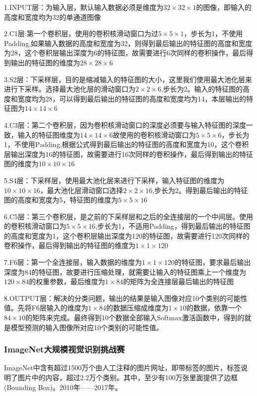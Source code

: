 \documentclass[openbib]{article}
\begin{document}
1.INPUT层：为输入层，默认输入数据必须是维度为$32\times32\times1$的图像，即输入的高度和宽度均为32的单通道图像

2.C1层:第一个卷积层，使用的卷积核滑动窗口为过$5\times5\times1$，步长为1，不使用Padding,如果输入数据的高度和宽度为32，则得到最后输出的特征图的高度和宽度为28，这个卷积层输出深度为6的特征图，故需要进行6次同样的卷积操作，最后得到输出的特征图的维度为$28\times28\times6$

3.S2层：下采样层，目的是缩减输入的特征图的大小，这里我们使用最大池化层来进行下采样。选择最大池化层的滑动窗口为$2\times2\times6$,步长为2。输入的特征图的高度和宽度均为28，可以得到最后输出的特征图的高度和宽度均为14，本层输出的特征图为$14\times14\times6$

4.C3层：第二个卷积层，因为卷积核滑动窗口的深度必须要与输入特征图的深度一致，输入的特征图维度为$14\times14\times6$故使用的卷积核滑动窗口为$5\times5\times6$，步长为1，不使用Padding,根据公式得到最后输出的特征图的高度和宽度为10，这个卷积层输出深度为16的特征图，故需要进行16次同样的卷积操作，最后得到输出的特征图的维度为$10\times10\times16$

5.S4层：下采样层，使用最大池化层来进行下采样，输入特征图的维度为$10\times10\times16$，最大池化层滑动窗口选择$2\times2\times16$,步长为2。得到最后输出的特征图的高度和宽度为5，特征图的维度为$5\times5\times16$

6.C5层：第三个卷积层，是之前的下采样层和之后的全连接层的一个中间层。使用的卷积核滑动窗口为$5\times5\times16$,步长为1，不适用Padding，得到最后输出的特征图的高度和宽度为1，这个卷积层输出深度为120的特征图，故需要进行120次同样的卷积操作，最后得到输出的特征图的维度为$1\times1\times120$

7.F6层：第一个全连接层，输入数据的维度为$1\times1\times120$的特征图，要求最后输出深度为84的特征图，故要进行压缩处理，就需要让输入的特征图乘上一个维度为$120\times84$的权重参数，最后维度为$1\times84$的矩阵为全连接层最后输出的特征图

8.OUTPUT层：解决的分类问题，输出的结果是输入图像对应10个类别的可能性值。先将F6层输入的维度为$1\times84$的数据压缩成维度为$1\times10$的数据，依靠一个$84\times10$的矩阵来完成。最终得到10个数据全部输入Softmax激活函数中，得到的就是模型预测的输入图像所对应10个类别的可能性值。

\subsubsection{ImageNet大规模视觉识别挑战赛}
ImageNet中含有超过1500万个由人工注释的图片网址，即带标签的图片，标签说明了图片中的内容，超过2.2万个类别。其中，至少有100万张里面提供了边框(Bounding Box)。2010年——2017年。
\end{document}
